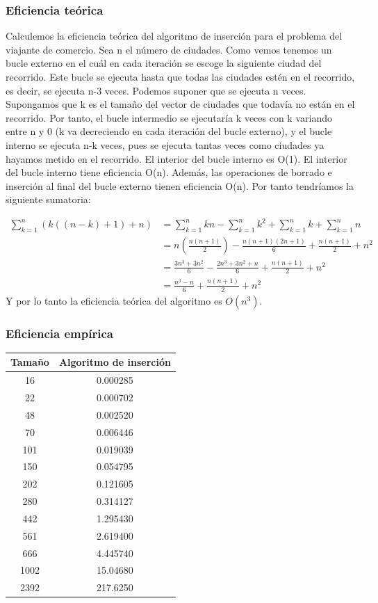 \documentclass[a4]{article}
\begin{document}
\subsubsection{Eficiencia teórica}

Calculemos la eficiencia teórica del algoritmo de inserción para el
problema del viajante de comercio. Sea n el número de ciudades. Como
vemos tenemos un bucle externo en el cuál en cada iteración se escoge
la siguiente ciudad del recorrido. Este bucle se ejecuta hasta que
todas las ciudades estén en el recorrido, es decir, se ejecuta n-3
veces. Podemos suponer que se ejecuta n veces. Supongamos que k es el
tamaño del vector de ciudades que todavía no están en el
recorrido. Por tanto, el bucle intermedio se ejecutaría k veces con k
variando entre n y 0 (k va decreciendo en cada iteración del bucle
externo), y el bucle interno se ejecuta n-k veces, pues se ejecuta
tantas veces como ciudades ya hayamos metido en el recorrido. El
interior del bucle interno es O(1). El interior del bucle interno
tiene eficiencia O(n). Además, las operaciones de borrado e inserción
al final del bucle externo tienen eficiencia O(n). Por tanto
tendríamos la siguiente sumatoria:

\begin{align*}
\sum_{k=1}^{n}(k((n-k)+1)+n)&=\sum_{k=1}^{n}kn-\sum_{k=1}^{n}k^2+\sum_{k=1}^{n}k+\sum_{k=1}^{n}n\\&=n(\frac{n(n+1)}{2})-\frac{n(n+1)(2n+1)}{6}+\frac{n(n+1)}{2}+n^2\\&=\frac{3n^3+3n^2}{6}-\frac{2n^3+3n^2+n}{6}+\frac{n(n+1)}{2}+n^2\\&=\frac{n^3-n}{6}+\frac{n(n+1)}{2}+n^2
\end{align*}
Y por lo tanto la eficiencia teórica del algoritmo es $O(n^3)$.

\subsubsection{Eficiencia empírica}

\begin{tabular}{|c|c|} \hline
\textbf{Tamaño}& 
\textbf{Algoritmo de inserción}
  \\ \hline
     16      & 0.000285  \\
     22      & 0.000702  \\
     48      & 0.002520  \\
     70      & 0.006446  \\
     101     & 0.019039            \\
     150     & 0.054795  \\
     202     & 0.121605  \\
     280     & 0.314127    \\
     442     & 1.295430    \\
     561     & 2.619400  \\
     666     & 4.445740       \\
     1002    & 15.04680  \\
     2392    & 217.6250   \\
\hline
\end{tabular}
\end{document}
